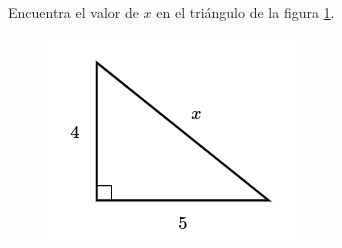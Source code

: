 Encuentra el valor de $x$ en el triángulo de la figura \ref{fig:lados_pitagoras_06}.

\begin{minipage}[t][][t]{0.35\textwidth}
    \begin{figure}[H]
        \centering
        \includegraphics[width=0.9\linewidth]{../images/lados_pitagoras_06.png}

        \caption{}
        \label{fig:lados_pitagoras_06}
    \end{figure}
\end{minipage}\hfill
\begin{minipage}[t][][t]{0.6\textwidth}
    \begin{solutionbox}{8cm}

    \end{solutionbox}
\end{minipage}
